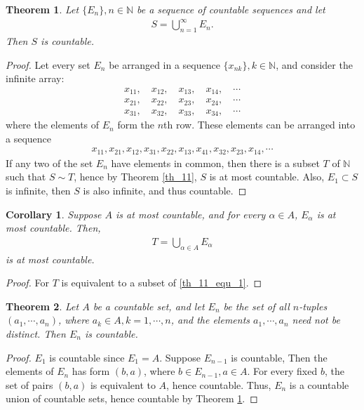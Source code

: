 \documentclass[10pt]{book}
\newtheorem{theorem}{Theorem}[chapter]
\newtheorem{corollary}{Corollary}[theorem]
\theoremstyle{definition}
\numberwithin{equation}{chapter}
\begin{document}
\medskip

\begin{theorem}\label{th_12}
Let $\{E_n\}, n \in \mathbb{N}$ be a sequence of countable sequences and let 
\begin{align}\label{th_11_equ_1}
    S = \bigcup^\infty_{n=1} E_n.
\end{align}
Then $S$ is countable.
\end{theorem}
\begin{proof}
Let every set $E_n$ be arranged in a sequence $\{x_{nk}\}, k \in \mathbb{N}$, and consider the infinite array:
\begin{align*}
    x_{11}, \quad x_{12}, \quad x_{13}, \quad x_{14}, \quad \cdots \\
    x_{21}, \quad x_{22}, \quad x_{23}, \quad x_{24}, \quad \cdots \\
    x_{31}, \quad x_{32}, \quad x_{33}, \quad x_{34}, \quad \cdots
\end{align*}
where the elements of $E_n$ form the $n$th row. These elements can be arranged into a sequence
\begin{align*}
    x_{11}, x_{21}, x_{12}, x_{31}, x_{22}, x_{13}, x_{41}, x_{32}, x_{23}, x_{14}, \cdots
\end{align*}
If any two of the set $E_n$ have elements in common, then there is a subset $T$ of $\mathbb{N}$ such that $S \sim T$, hence by Theorem \ref{th_11}, $S$ is at most countable. Also, $E_1 \subset S$ is infinite, then $S$ is also infinite, and thus countable.
\end{proof}

\medskip

\begin{corollary}
Suppose $A$ is at most countable, and for every $\alpha \in A$, $E_{\alpha}$ is at most countable. Then,
\begin{align*}
    T = \bigcup_{\alpha \in A} E_{\alpha}
\end{align*}
is at most countable.
\end{corollary}
\begin{proof}
For $T$ is equivalent to a subset of \eqref{th_11_equ_1}.
\end{proof}

\medskip

\begin{theorem}\label{th_13}
Let $A$ be a countable set, and let $E_n$ be the set of all $n$-tuples $(a_1, \cdots, a_n)$, where $a_k \in A, k = 1, \cdots, n$, and the elements $a_1, \cdots, a_n$ need not be distinct. Then $E_n$ is countable.
\end{theorem}
\begin{proof}
$E_1$ is countable since $E_1 = A$. Suppose $E_{n-1}$ is countable, Then the elements of $E_n$ has form $(b,a)$, where $b \in E_{n-1}, a \in A$. For every fixed $b$, the set of pairs $(b,a)$ is equivalent to $A$, hence countable. Thus, $E_n$ is a countable union of countable sets, hence countable by Theorem \ref{th_12}.
\end{proof}
\end{document}
